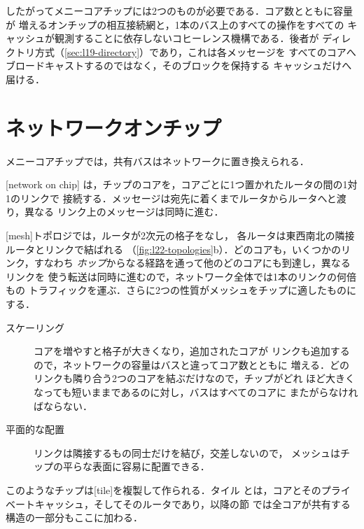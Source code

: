 \documentclass[../main.tex]{subfiles}
\begin{document}
したがってメニーコアチップには2つのものが必要である．コア数とともに容量が
増えるオンチップの相互接続網と，1本のバス上のすべての操作をすべての
キャッシュが観測することに依存しないコヒーレンス機構である．後者が
ディレクトリ方式（\cref{sec:l19-directory}）であり，これは各メッセージを
すべてのコアへブロードキャストするのではなく，そのブロックを保持する
キャッシュだけへ届ける．

\section{ネットワークオンチップ}
\label{sec:l22-noc}

メニーコアチップでは，共有バスはネットワークに置き換えられる．

\begin{definition}[ネットワークオンチップ]
  [network on chip]%
  は，チップのコアを，コアごとに1つ置かれたルータの間の1対1のリンクで
  接続する．メッセージは宛先に着くまでルータからルータへと渡り，異なる
  リンク上のメッセージは同時に進む．
\end{definition}

[mesh]トポロジでは，ルータが2次元の格子をなし，
各ルータは東西南北の隣接ルータとリンクで結ばれる
（\cref{fig:l22-topologies}b）．どのコアも，いくつかのリンク，すなわち
\emph{ホップ}からなる経路を通って他のどのコアにも到達し，異なるリンクを
使う転送は同時に進むので，ネットワーク全体では1本のリンクの何倍もの
トラフィックを運ぶ．さらに2つの性質がメッシュをチップに適したものにする．
\begin{description}
  \item[スケーリング] コアを増やすと格子が大きくなり，追加されたコアが
    リンクも追加するので，ネットワークの容量はバスと違ってコア数とともに
    増える．どのリンクも隣り合う2つのコアを結ぶだけなので，チップがどれ
    ほど大きくなっても短いままであるのに対し，バスはすべてのコアに
    またがらなければならない．
  \item[平面的な配置] リンクは隣接するもの同士だけを結び，交差しないので，
    メッシュはチップの平らな表面に容易に配置できる．
\end{description}
このようなチップは[tile]を複製して作られる．タイル
とは，コアとそのプライベートキャッシュ，そしてそのルータであり，以降の節
では全コアが共有する構造の一部分もここに加わる．
\end{document}
